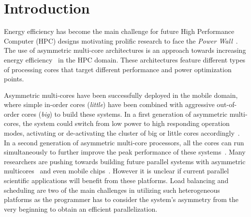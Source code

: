 
\chapter{Introduction}
Energy efficiency has become the main challenge for future High Performance Computer (HPC) designs motivating prolific research to face the \textit{Power Wall}~\cite{Kogge_Exascale_TR08}.
The use of asymmetric multi-core architectures is an approach towards increasing energy efficiency~\cite{Fedorova2009,Greenhalgh2011,Kumar:ISCA2004,Balakrishnan:ISCA2005} in the HPC domain.
These architectures feature different types of processing cores that target different performance and power optimization points.



Asymmetric multi-cores have been successfully deployed in the mobile domain, where simple in-order cores (\emph{little}) have been combined with aggressive out-of-order cores (\emph{big}) to build these systems. In a first generation of asymmetric multi-cores, the system could switch from low power to high responding operation modes, activating or de-activating the cluster of big or little cores accordingly~\cite{ARM}. In a second generation of asymmetric multi-core processors, all the cores can run simultaneously to further improve the peak performance of these systems~\cite{samsung}.
Many researchers are pushing towards building future parallel systems with asymmetric multicores~\cite{Suleman:APLOS2009,Fedorova2009, Greenhalgh2011, Joao:ASPLOS2012,Joao:ISCA2013} and even mobile chips~\cite{ARM4HPC_SC13}. 
However it is unclear if current parallel scientific applications will benefit from these platforms.
Load balancing and scheduling are two of the main challenges in utilizing such heterogeneous platforms as the programmer has to consider the system's asymmetry from the very beginning to obtain an efficient parallelization. 

